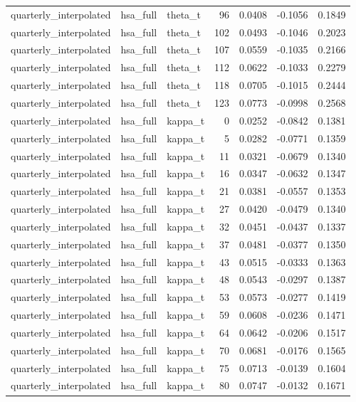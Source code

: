 \begin{tabular}{lllrrrr}
quarterly\_interpolated & hsa\_full & theta\_t & 96 & 0.0408 & -0.1056 & 0.1849 \\
quarterly\_interpolated & hsa\_full & theta\_t & 102 & 0.0493 & -0.1046 & 0.2023 \\
quarterly\_interpolated & hsa\_full & theta\_t & 107 & 0.0559 & -0.1035 & 0.2166 \\
quarterly\_interpolated & hsa\_full & theta\_t & 112 & 0.0622 & -0.1033 & 0.2279 \\
quarterly\_interpolated & hsa\_full & theta\_t & 118 & 0.0705 & -0.1015 & 0.2444 \\
quarterly\_interpolated & hsa\_full & theta\_t & 123 & 0.0773 & -0.0998 & 0.2568 \\
quarterly\_interpolated & hsa\_full & kappa\_t & 0 & 0.0252 & -0.0842 & 0.1381 \\
quarterly\_interpolated & hsa\_full & kappa\_t & 5 & 0.0282 & -0.0771 & 0.1359 \\
quarterly\_interpolated & hsa\_full & kappa\_t & 11 & 0.0321 & -0.0679 & 0.1340 \\
quarterly\_interpolated & hsa\_full & kappa\_t & 16 & 0.0347 & -0.0632 & 0.1347 \\
quarterly\_interpolated & hsa\_full & kappa\_t & 21 & 0.0381 & -0.0557 & 0.1353 \\
quarterly\_interpolated & hsa\_full & kappa\_t & 27 & 0.0420 & -0.0479 & 0.1340 \\
quarterly\_interpolated & hsa\_full & kappa\_t & 32 & 0.0451 & -0.0437 & 0.1337 \\
quarterly\_interpolated & hsa\_full & kappa\_t & 37 & 0.0481 & -0.0377 & 0.1350 \\
quarterly\_interpolated & hsa\_full & kappa\_t & 43 & 0.0515 & -0.0333 & 0.1363 \\
quarterly\_interpolated & hsa\_full & kappa\_t & 48 & 0.0543 & -0.0297 & 0.1387 \\
quarterly\_interpolated & hsa\_full & kappa\_t & 53 & 0.0573 & -0.0277 & 0.1419 \\
quarterly\_interpolated & hsa\_full & kappa\_t & 59 & 0.0608 & -0.0236 & 0.1471 \\
quarterly\_interpolated & hsa\_full & kappa\_t & 64 & 0.0642 & -0.0206 & 0.1517 \\
quarterly\_interpolated & hsa\_full & kappa\_t & 70 & 0.0681 & -0.0176 & 0.1565 \\
quarterly\_interpolated & hsa\_full & kappa\_t & 75 & 0.0713 & -0.0139 & 0.1604 \\
quarterly\_interpolated & hsa\_full & kappa\_t & 80 & 0.0747 & -0.0132 & 0.1671 \\

\end{tabular}
